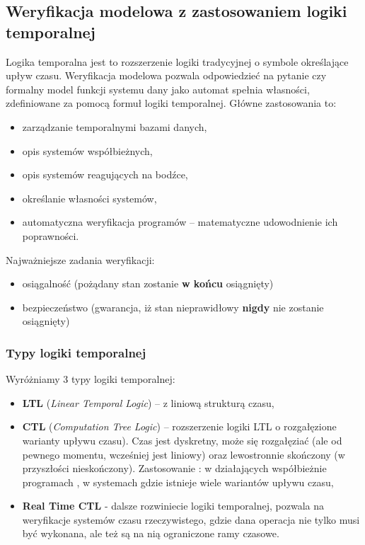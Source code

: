\subsection{Weryfikacja modelowa z zastosowaniem logiki temporalnej}

Logika temporalna jest to rozszerzenie logiki tradycyjnej o symbole określające upływ czasu. Weryfikacja modelowa pozwala odpowiedzieć na pytanie czy formalny model funkcji systemu dany jako automat spełnia własności, zdefiniowane za pomocą formuł logiki temporalnej. Główne zastosowania to:


\begin{itemize}
	\item zarządzanie temporalnymi bazami danych,
	\item opis systemów współbieżnych,
	\item opis systemów reagujących na bodźce,
	\item określanie własności systemów,
	\item automatyczna weryfikacja programów – matematyczne udowodnienie ich poprawności.
\end{itemize}

Najważniejsze zadania weryfikacji:

\begin{itemize}
	\item osiągalność (pożądany stan zostanie \textbf{w końcu} osiągnięty)
	\item bezpieczeństwo (gwarancja, iż stan nieprawidłowy \textbf{nigdy} nie zostanie osiągnięty)
\end{itemize}

\subsubsection{Typy logiki temporalnej}

Wyróżniamy 3 typy logiki temporalnej:

\begin{itemize}
	\item \textbf{LTL} (\textit{Linear Temporal Logic}) – z liniową strukturą czasu,
	\item \textbf{CTL} (\textit{Computation Tree Logic}) – rozszerzenie logiki LTL o rozgałęzione warianty upływu czasu). Czas jest dyskretny, może się rozgałęziać (ale od pewnego momentu, wcześniej jest liniowy) oraz lewostronnie skończony (w przyszłości nieskończony). Zastosowanie : w działających współbieżnie programach , w systemach gdzie istnieje wiele wariantów upływu czasu,
	\item \textbf{Real Time CTL} - dalsze rozwiniecie logiki temporalnej, pozwala na weryfikacje systemów czasu rzeczywistego, gdzie dana operacja nie tylko musi być wykonana, ale też są na nią ograniczone ramy czasowe.
\end{itemize}

